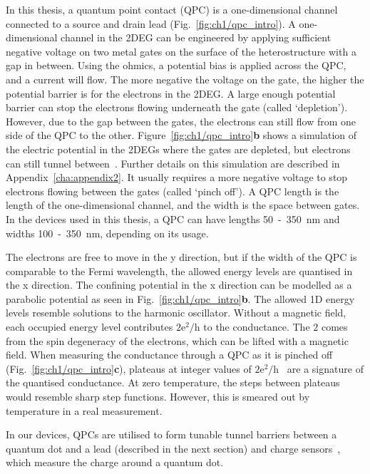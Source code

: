 In this thesis, a quantum point contact (QPC) is a one-dimensional channel connected to a source and drain lead (Fig.~\ref{fig:ch1/qpc_intro}). A one-dimensional channel in the 2DEG can be engineered by applying sufficient negative voltage on two metal gates on the surface of the heterostructure with a gap in between. Using the ohmics, a potential bias is applied across the QPC, and a current will flow. The more negative the voltage on the gate, the higher the potential barrier is for the electrons in the 2DEG. A large enough potential barrier can stop the electrons flowing underneath the gate (called `depletion'). However, due to the gap between the gates, the electrons can still flow from one side of the QPC to the other. Figure~\ref{fig:ch1/qpc_intro}\textbf{b} shows a simulation of the electric potential in the 2DEGs where the gates are depleted, but electrons can still tunnel between~\cite{Davies1995}. Further details on this simulation are described in Appendix~\ref{cha:appendix2}. It usually requires a more negative voltage to stop electrons flowing between the gates (called `pinch off'). A QPC length is the length of the one-dimensional channel, and the width is the space between gates. In the devices used in this thesis, a QPC can have lengths 50~-~\qty{350}{nm} and widths 100~-~\qty{350}{nm}, depending on its usage.

The electrons are free to move in the y direction, but if the width of the QPC is comparable to the Fermi wavelength, the allowed energy levels are quantised in the x direction. The confining potential in the x direction can be modelled as a parabolic potential as seen in Fig.~\ref{fig:ch1/qpc_intro}\textbf{b}. The allowed 1D energy levels resemble solutions to the harmonic oscillator. Without a magnetic field, each occupied energy level contributes $\mathrm{2e^2/h}$ to the conductance. The $2$ comes from the spin degeneracy of the electrons, which can be lifted with a magnetic field. When measuring the conductance through a QPC as it is pinched off (Fig.~\ref{fig:ch1/qpc_intro}\textbf{c}), plateaus at integer values of $\mathrm{2e^2/h}$~\cite{qpc_first_measurement} are a signature of the quantised conductance. At zero temperature, the steps between plateaus would resemble sharp step functions. However, this is smeared out by temperature in a real measurement.

In our devices, QPCs are utilised to form tunable tunnel barriers between a quantum dot and a lead (described in the next section) and charge sensors~\cite{cs_first_measurement}, which measure the charge around a quantum dot. 




